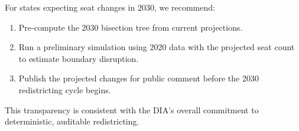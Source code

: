 For states expecting seat changes in 2030, we recommend:
\begin{enumerate}
\item Pre-compute the 2030 bisection tree from current projections.
\item Run a preliminary simulation using 2020 data with the projected
      seat count to estimate boundary disruption.
\item Publish the projected changes for public comment before the 2030
      redistricting cycle begins.
\end{enumerate}

This transparency is consistent with the DIA's overall commitment to
deterministic, auditable redistricting.

